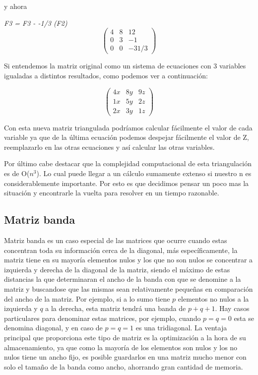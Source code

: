 y ahora

\emph{F3 = F3 - -1/3 (F2) } 
\[ \left( \begin{array}{ccc}
4 & 8 & 12 \\
0 & 3 & -1 \\
0 & 0 & -31/3 \end{array} \right)\] 

Si entendemos la matriz original como un sistema de ecuaciones con 3 variables igualadas a distintos resultados, como podemos ver a continuación:

\[ \left( \begin{array}{ccc}
4x & 8y & 9z \\
1x & 5y & 2z \\
2x & 3y & 1z \end{array} \right)\] 

Con esta nueva matriz triangulada podríamos calcular fácilmente el valor de cada variable ya que de la última ecuación podemos despejar fácilmente el valor de Z, reemplazarlo en las otras ecuaciones y así calcular las otras variables.



Por último cabe destacar que la complejidad computacional de esta triangulación es de O($n^3$). Lo cual puede llegar a un cálculo sumamente extenso si nuestro n es considerablemente importante. Por esto es que decidimos pensar un poco mas la situación y encontrarle la vuelta para resolver en un tiempo razonable.

\subsection{Matriz banda}

Matriz banda es un caso especial de las matrices que ocurre cuando estas concentran toda su información cerca de la diagonal, más específicamente, la matriz tiene en su mayoría elementos nulos y los que no son nulos se concentrar a izquierda y derecha de la diagonal de la matriz, siendo el máximo de estas distancias la que determinaran el ancho de la banda con que se denomine a la matriz y buscandose que las mismas sean relativamente pequeñas en comparación del ancho de la matriz. Por ejemplo, si a lo sumo tiene $p$ elementos no nulos a la izquierda y $q$ a la derecha, esta matriz tendrá una banda de $p+q+1$. Hay casos particulares para denominar estas matrices, por ejemplo, cuando $p = q = 0$ esta se denomina diagonal, y en caso de $p = q = 1$  es una tridiagonal.
La ventaja principal que proporciona este tipo de matriz es la optimización a la hora de su almacenamiento, ya que como la mayoría de los elementos son nulos y los no nulos tiene un ancho fijo, es posible guardarlos en una matriz mucho menor con solo el tamaño de la banda como ancho, ahorrando gran cantidad de memoria.

